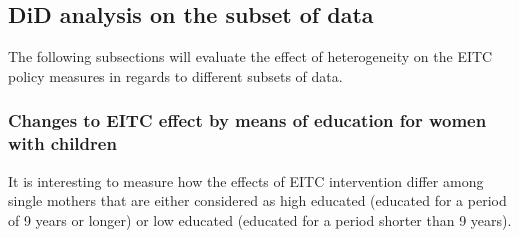 \documentclass{article}
\begin{document}
\subsection{DiD analysis on the subset of data}

The following subsections will evaluate the effect of heterogeneity on the EITC policy measures in regards to different subsets of data.

\subsubsection{Changes to EITC effect by means of education for women with children}

It is interesting to measure how the effects of EITC intervention differ among single mothers that are either considered as high educated (educated for a period of 9 years or longer) or low educated (educated for a period shorter than 9 years). 
\end{document}
